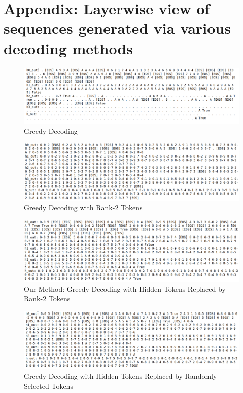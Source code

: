 \documentclass{article}
\begin{document}
\clearpage
\section*{Appendix: Layerwise view of sequences generated via various decoding methods}

\begin{figure}[H]
    \centering
    \includegraphics[width=\textwidth]{greedy_decoding.png}
    \caption{Greedy Decoding}
    \label{fig:appendix_greedy}
\end{figure}

\begin{figure}[H]
    \centering
    \includegraphics[width=\textwidth]{rank2_decoding.png}
    \caption{Greedy Decoding with Rank-2 Tokens}
    \label{fig:appendix_rank2}
\end{figure}

\begin{figure}[H]
    \centering
    \includegraphics[width=\textwidth]{our_method_decoding.png}
    \caption{Our Method: Greedy Decoding with Hidden Tokens Replaced by Rank-2 Tokens}
    \label{fig:appendix_our_method}
\end{figure}

\begin{figure}[H]
    \centering
    \includegraphics[width=\textwidth]{random_tokens_decoding.png}
    \caption{Greedy Decoding with Hidden Tokens Replaced by Randomly Selected Tokens}
    \label{fig:appendix_random}
\end{figure}
\end{document}
